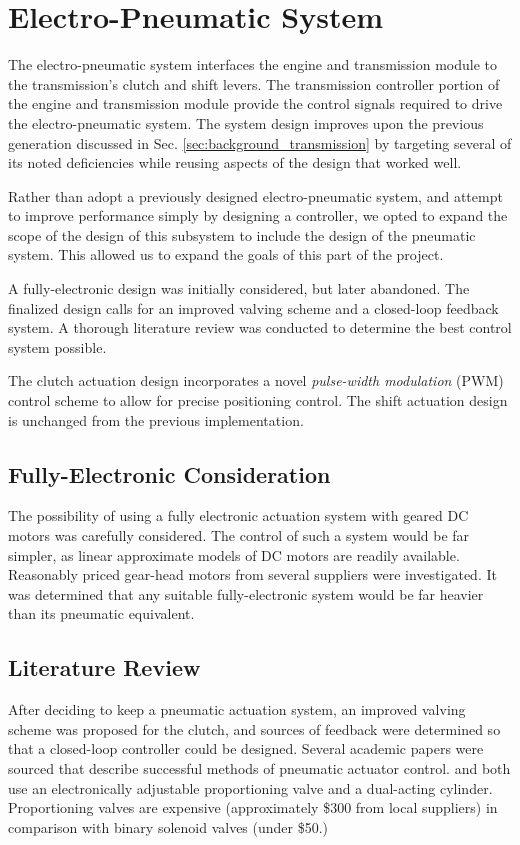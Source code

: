 \section{Electro-Pneumatic System}

The electro-pneumatic system interfaces the engine and transmission module to the transmission's clutch and shift levers. The transmission controller portion of the engine and transmission module provide the control signals required to drive the electro-pneumatic system. The system design improves upon the previous generation discussed in Sec. \ref{sec:background_transmission} by targeting several of its noted deficiencies while reusing aspects of the design that worked well.

Rather than adopt a previously designed electro-pneumatic system, and attempt to improve performance simply by designing a controller, we opted to expand the scope of the design of this subsystem to include the design of the pneumatic system. This allowed us to expand the goals of this part of the project.

A fully-electronic design was initially considered, but later abandoned. The finalized design calls for an improved valving scheme and a closed-loop feedback system. A thorough literature review was conducted to determine the best control system possible. 

The clutch actuation design incorporates a novel \emph{pulse-width modulation} (PWM) control scheme to allow for precise positioning control. The shift actuation design is unchanged from the previous implementation. 

\subsection{Fully-Electronic Consideration}

The possibility of using a fully electronic actuation system with geared DC motors was carefully considered. The control of such a system would be far simpler, as linear approximate models of DC motors are readily available. Reasonably priced gear-head motors from several suppliers were investigated. It was determined that any suitable fully-electronic system would be far heavier than its pneumatic equivalent.

\subsection{Literature Review}

After deciding to keep a pneumatic actuation system, an improved valving scheme was proposed for the clutch, and sources of feedback were determined so that a closed-loop controller could be designed. Several academic papers were sourced that describe successful methods of pneumatic actuator control.  and \citet{adaptive_pneumatic} both use an electronically adjustable proportioning valve and a dual-acting cylinder. Proportioning valves are expensive (approximately \$300 from local suppliers) in comparison with binary solenoid valves (under \$50.)

